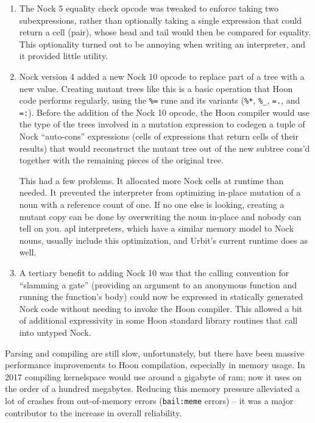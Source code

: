 \documentclass[twoside]{article}
\begin{document}
\begin{enumerate}
  \item  The Nock 5 equality check opcode was tweaked to enforce taking two subexpressions, rather than optionally taking a single expression that could return a cell (pair), whose head and tail would then be compared for equality.  This optionality turned out to be annoying when writing an interpreter, and it provided little utility.
  \item  Nock version 4 added a new Nock 10 opcode to replace part of a tree with a new value.  Creating mutant trees like this is a basic operation that Hoon code performs regularly, using the \lstinline[style=inlinecode]{%=} rune and its variants (\lstinline[style=inlinecode]{%*}, \lstinline[style=inlinecode]{%_}, \lstinline[style=inlinecode]{=.}, and \lstinline[style=inlinecode]{=:}).  Before the addition of the Nock 10 opcode, the Hoon compiler would use the type of the trees involved in a mutation expression to codegen a tuple of Nock ``auto-cons'' expressions (cells of expressions that return cells of their results) that would reconstruct the mutant tree out of the new subtree cons'd together with the remaining pieces of the original tree.
  
  This had a few problems.  It allocated more Nock cells at runtime than needed.  It prevented the interpreter from optimizing in-place mutation of a noun with a reference count of one.  If no one else is looking, creating a mutant copy can be done by overwriting the noun in-place and nobody can tell on you.  {\sc apl} interpreters, which have a similar memory model to Nock nouns, usually include this optimization, and Urbit's current runtime does as well.

  \item  A tertiary benefit to adding Nock 10 was that the calling convention for ``slamming a gate'' (providing an argument to an anonymous function and running the function's body) could now be expressed in statically generated Nock code without needing to invoke the Hoon compiler.  This allowed a bit of additional expressivity in some Hoon standard library routines that call into untyped Nock.
\end{enumerate}

Parsing and compiling are still slow, unfortunately, but there have been massive performance improvements to Hoon compilation, especially in memory usage.  In 2017 compiling kernelspace would use around a gigabyte of {\sc ram}; now it uses on the order of a hundred megabytes.  Reducing this memory pressure alleviated a lot of crashes from out-of-memory errors (\lstinline[style=inlinecode]{bail:meme} errors) – it was a major contributor to the increase in overall reliability.
\end{document}
